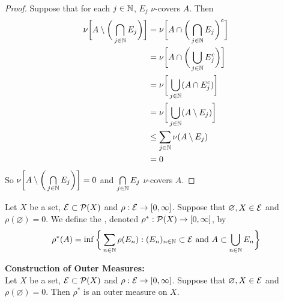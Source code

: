 \documentclass{book}
\begin{document}
	\begin{proof}
		Suppose that for each $j \in \mathbb{N}$, $E_j$ $\nu$-covers $A$. Then 
		\begin{align*}
			\nu \bigg[ A \setminus \bigg( \bigcap_{j \in \mathbb{N}} E_j \bigg) \bigg]
			& = \nu \bigg[ A \cap \bigg( \bigcap_{j \in \mathbb{N}} E_j \bigg)^c \bigg] \\
			& = \nu \bigg[ A \cap \bigg( \bigcup_{j \in \mathbb{N}} E_j^c \bigg) \bigg] \\
			& = \nu \bigg[ \bigcup_{j \in \mathbb{N}} (A \cap E_j^c) \bigg] \\
			& = \nu \bigg[ \bigcup_{j \in \mathbb{N}} (A \setminus E_j) \bigg] \\
			& \leq \sum_{j \in \mathbb{N}} \nu(A \setminus E_j) \\
			& = 0
		\end{align*}
		So $\nu \bigg[ A \setminus \bigg( \bigcap\limits_{j \in \mathbb{N}} E_j \bigg) \bigg] = 0$ and $\bigcap\limits_{j \in \mathbb{N}} E_j$ $\nu$-covers $A$.
	\end{proof}

	
	\begin{defn}   
		Let $X$ be a set, $\mathcal{E} \subset \mathcal{P}(X)$ and $\rho: \mathcal{E} \rightarrow [0, \infty]$. Suppose that $\varnothing, X \in \mathcal{E}$ and $\rho(\varnothing) = 0$. We define the , denoted $\rho^*:\mathcal{P}(X) \rightarrow [0, \infty]$, by 
		$$\rho^*(A) = \inf \bigg \{\sum_{n \in \mathbb{N}}\rho(E_n): (E_n)_{n \in \mathbb{N}} \subset \mathcal{E} \text{ and }A \subset \bigcup_{n \in \mathbb{N}}E_n \bigg \}$$ 
	\end{defn}
	
	\begin{ex}\textbf{Construction of Outer Measures:}    \\
		Let $X$ be a set, $\mathcal{E} \subset \mathcal{P}(X)$ and $\rho: \mathcal{E} \rightarrow [0, \infty]$. Suppose that $\varnothing, X \in \mathcal{E}$ and $\rho(\varnothing) = 0$. Then $\rho^*$ is an outer measure on $X$.
	\end{ex}
	
\end{document}
